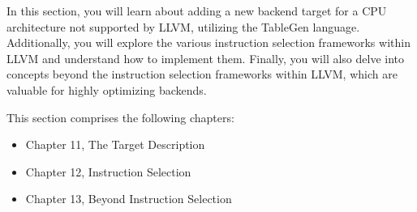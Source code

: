 In this section, you will learn about adding a new backend target for a CPU architecture not supported by LLVM, utilizing the TableGen language. Additionally, you will explore the various instruction selection frameworks within LLVM and understand how to implement them. Finally, you will also delve into concepts beyond the instruction selection frameworks within LLVM, which are valuable for highly optimizing backends.

This section comprises the following chapters:

\begin{itemize}
\item
Chapter 11, The Target Description

\item
Chapter 12, Instruction Selection

\item
Chapter 13, Beyond Instruction Selection
\end{itemize}